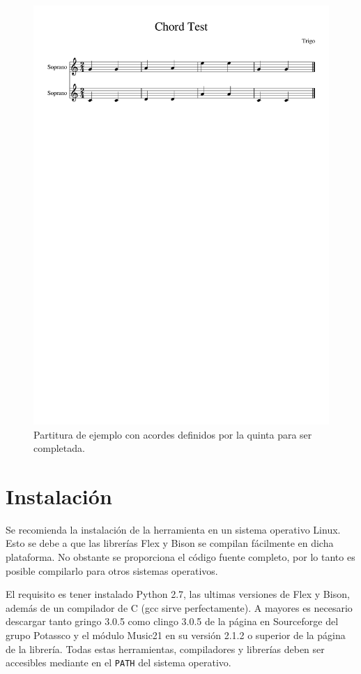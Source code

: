   \begin{figure}
  	\centering
  	\includegraphics[width=0.8\linewidth]{imagenes/scores/Chord_Test.pdf}
  	\caption{Partitura de ejemplo con acordes definidos por la quinta para ser completada.}
  	\label{fig:chord_test}
  \end{figure}
 
\chapter{Instalación}
\label{chap:installation}
Se recomienda la instalación de la herramienta en un sistema operativo Linux. Esto se debe a que las librerías Flex y Bison se  compilan fácilmente en dicha plataforma. No obstante se proporciona el código fuente completo, por lo tanto es posible compilarlo para otros sistemas operativos.

El requisito es tener instalado Python 2.7, las ultimas versiones de Flex y Bison, además de un compilador de C (gcc sirve perfectamente). A mayores es necesario descargar tanto gringo 3.0.5 como clingo 3.0.5 de la página en Sourceforge del grupo Potassco\cite{potasscoweb} y el módulo Music21 en su versión 2.1.2 o superior de la página de la librería. Todas estas herramientas, compiladores y librerías deben ser accesibles mediante en el \texttt{PATH} del sistema operativo.

